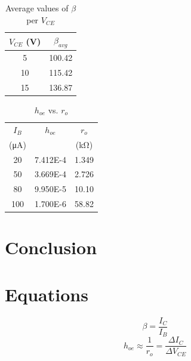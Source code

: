 \begin{table}[hbtp]
  \centering
  \begin{tabular}{cc}
    $V_{CE}$ (\si{V}) & $\beta_{avg}$ \\
    \hline
    5                 & 100.42        \\
    10                & 115.42        \\
    15                & 136.87        \\
  \end{tabular}
  \caption{\label{tab:beta_VCE} Average values of $\beta$ per $V_{CE}$}
\end{table}

\begin{table}[hbtp]
  \centering
  \begin{tabular}{ccc}
    $I_B$                & $h_{oe}$ & $r_o$            \\
    (\si{\micro\ampere}) &          & (\si{\kilo\ohm}) \\
    \hline
    20                   & 7.412E-4 & 1.349            \\
    50                   & 3.669E-4 & 2.726            \\
    80                   & 9.950E-5 & 10.10            \\
    100                  & 1.700E-6 & 58.82            \\
  \end{tabular}
  \caption{\label{tab:hoe} $h_{oe}$ vs. $r_o$}
\end{table}

\section{Conclusion}
\label{sec:conclusion}

\section{Equations}

%
\begin{equation}
  \label{eq:beta}
  \beta = \frac{I_C}{I_B}
\end{equation}
%
\begin{equation}
  \label{eq:hoe}
  h_{oe} \approx \frac{1}{r_o} = \frac{\Delta I_C}{\Delta V_{CE}}
\end{equation}
%


